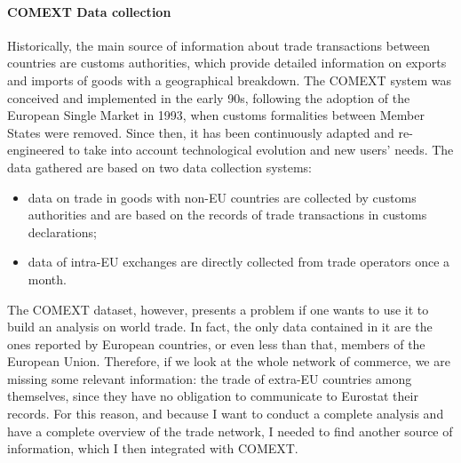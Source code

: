 
\paragraph{COMEXT Data collection}
Historically, the main source of information about trade transactions between countries are customs authorities, which provide detailed information on exports and imports of goods with a geographical breakdown.
The COMEXT system was conceived and implemented in the early 90s,  following the adoption of the European Single Market in 1993, when customs formalities between Member States were removed. Since then, it has been continuously adapted and re-engineered to take into account technological evolution and new users' needs. The data gathered are based on two data collection systems:
\begin{itemize}
    \item data on trade in goods with non-EU countries are collected by customs authorities and are based on the records of trade transactions in customs declarations;
    \item data of intra-EU exchanges are directly collected from trade operators once a month.
\end{itemize}

The COMEXT dataset, however, presents a problem if one wants to use it to build an analysis on world trade. In fact, the only data contained in it are the ones reported by European countries, or even less than that, members of the European Union. Therefore, if we look at the whole network of commerce, we are missing some relevant information: the trade of extra-EU countries among themselves, since they have no obligation to communicate to Eurostat their records.
For this reason, and because I want to conduct a complete analysis and have a complete overview of the trade network, I needed to find another source of information, which I then integrated with COMEXT.

